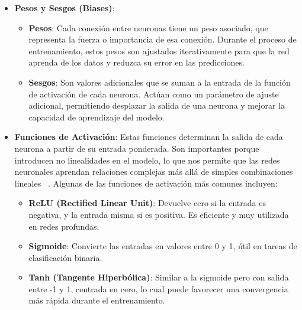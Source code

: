 \documentclass[11pt]{article} %
\begin{document}
\begin{itemize}
   \item\textbf{Pesos y Sesgos (Biases)}:
    \begin{itemize}
        \item \textbf{Pesos}: Cada conexión entre neuronas tiene un peso asociado, que representa la fuerza o importancia de esa conexión. Durante el proceso de entrenamiento, estos pesos son ajustados iterativamente para que la red aprenda de los datos y reduzca su error en las predicciones.
        \item \textbf{Sesgos}: Son valores adicionales que se suman a la entrada de la función de activación de cada neurona. Actúan como un parámetro de ajuste adicional, permitiendo desplazar la salida de una neurona y mejorar la capacidad de aprendizaje del modelo.
    \end{itemize}
    \item \textbf{Funciones de Activación}: Estas funciones determinan la salida de cada neurona a partir de su entrada ponderada. Son importantes porque introducen no linealidades en el modelo, lo que nos permite que las redes neuronales aprendan relaciones complejas más allá de simples combinaciones lineales ~\cite{datacamp_redes}. Algunas de las funciones de activación más comunes incluyen:
    \begin{itemize}
        \item \textbf{ReLU (Rectified Linear Unit)}: Devuelve cero si la entrada es negativa, y la entrada misma si es positiva. Es eficiente y muy utilizada en redes profundas.
        \item \textbf{Sigmoide}: Convierte las entradas en valores entre 0 y 1, útil en tareas de clasificación binaria. 
        \item \textbf{Tanh (Tangente Hiperbólica)}: Similar a la sigmoide pero con salida entre -1 y 1, centrada en cero, lo cual puede favorecer una convergencia más rápida durante el entrenamiento.
    \end{itemize}
\end{itemize}
\end{document}
